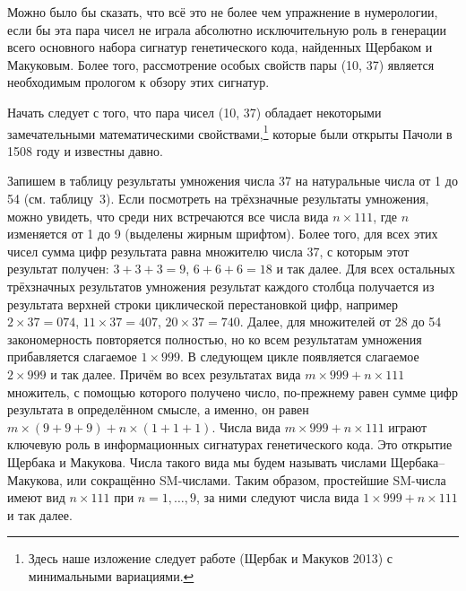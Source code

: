 \documentclass[12pt]{article}
\begin{document}
Можно было бы сказать, что всё это не более чем упражнение в нумерологии, если бы эта пара чисел не играла абсолютно исключительную роль в генерации всего основного набора сигнатур генетического кода, найденных Щербаком и Макуковым. Более того, рассмотрение особых свойств пары (10, 37) является необходимым прологом к обзору этих сигнатур.

Начать следует с того, что пара чисел (10, 37) обладает некоторыми замечательными математическими свойствами,\footnote{Здесь наше изложение следует работе (Щербак и Макуков 2013) с минимальными вариациями.} которые были открыты Пачоли в 1508 году и известны давно.

Запишем в таблицу результаты умножения числа 37 на натуральные числа от 1 до 54 (см. таблицу~3). Если посмотреть на трёхзначные результаты умножения, можно увидеть, что среди них встречаются все числа вида $n \times 111$, где $n$ изменяется от 1 до 9 (выделены жирным шрифтом). Более того, для всех этих чисел сумма цифр результата равна множителю числа 37, с которым этот результат получен: $3 + 3 + 3 = 9$, $6 + 6 + 6 = 18$ и так далее. Для всех остальных трёхзначных результатов умножения результат каждого столбца получается из результата верхней строки циклической перестановкой цифр, например $2 \times 37 = 074$, $11 \times 37 = 407$, $20 \times 37 = 740$. Далее, для множителей от 28 до 54 закономерность повторяется полностью, но ко всем результатам умножения прибавляется слагаемое $1 \times 999$. В следующем цикле появляется слагаемое $2 \times 999$ и так далее. Причём во всех результатах вида $m \times 999 + n \times 111$ множитель, с помощью которого получено число, по-прежнему равен сумме цифр результата в определённом смысле, а именно, он равен $m \times (9 + 9 + 9) + n \times (1 + 1 + 1)$. Числа вида $m \times 999 + n \times 111$ играют ключевую роль в информационных сигнатурах генетического кода. Это открытие Щербака и Макукова. Числа такого вида мы будем называть числами Щербака--Макукова, или сокращённо SM-числами. Таким образом, простейшие SM-числа имеют вид $n \times 111$ при $n = 1, \ldots, 9$, за ними следуют числа вида $1 \times 999 + n \times 111$ и так далее.
\end{document}
